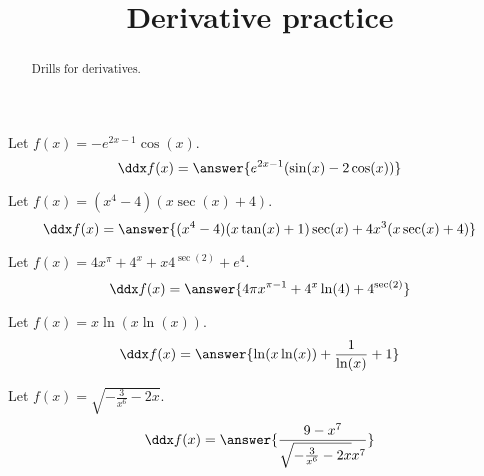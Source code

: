 \documentclass{ximera}
\title[Reinforce:]{Derivative practice}
\begin{document}
\begin{abstract}
  Drills for derivatives.
\end{abstract}
\maketitle


\begin{shuffle}


\begin{exercise}
Let $f(x)=-e^{2 x-1} \cos (x)$.
\[
\ddx f(x) = \answer{e^{2 x-1} (\sin (x)-2 \cos (x))}
\]
\end{exercise}


\begin{exercise}
Let $f(x)=(x^4-4) (x \sec (x)+4)$.
\[
\ddx f(x) = \answer{(x^4-4) (x \tan (x)+1) \sec (x)+4 x^3 (x \sec (x)+4)}
\]
\end{exercise}

\begin{exercise}
Let $f(x)=4 x^{\pi }+4^x+x 4^{\sec (2)}+e^4$.
\[
\ddx f(x) = \answer{4 \pi  x^{\pi -1}+4^x \ln (4)+4^{\sec (2)}}
\]
\end{exercise}



\begin{exercise}
Let $f(x)=x \ln (x \ln (x))$.
\[
\ddx f(x) = \answer{\ln (x \ln (x))+\frac{1}{\ln (x)}+1}
\]
\end{exercise}

\begin{exercise}
Let $f(x)=\sqrt{-\frac{3}{x^6}-2 x}$.
\[
\ddx f(x) = \answer{\frac{9-x^7}{\sqrt{-\frac{3}{x^6}-2 x} x^7}}
\]
\end{exercise}


\end{shuffle}
\end{document}
